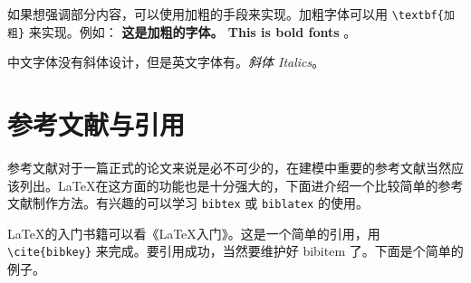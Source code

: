 如果想强调部分内容，可以使用加粗的手段来实现。加粗字体可以用 \verb|\textbf{加粗}| 来实现。例如： \textbf{这是加粗的字体。 This is bold fonts} 。

中文字体没有斜体设计，但是英文字体有。\textit{斜体 Italics}。

\section{参考文献与引用}

参考文献对于一篇正式的论文来说是必不可少的，在建模中重要的参考文献当然应该列出。\LaTeX{}在这方面的功能也是十分强大的，下面进介绍一个比较简单的参考文献制作方法。有兴趣的可以学习 \verb|bibtex| 或 \verb|biblatex| 的使用。

\LaTeX{}的入门书籍可以看《\LaTeX{}入门》\cite{liuhaiyang2013latex}。这是一个简单的引用，用 \verb|\cite{bibkey}| 来完成。要引用成功，当然要维护好 bibitem 了。下面是个简单的例子。

